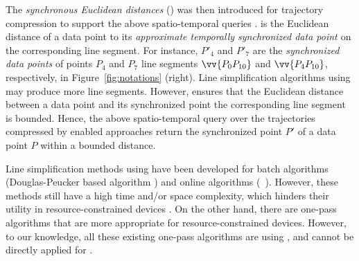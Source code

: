 

The \emph{synchronous Euclidean distances} (\sed) was then introduced for trajectory compression to support the above spatio-temporal queries \cite{Meratnia:Spatiotemporal}. \sed is the Euclidean distance of a data point to its \emph{approximate temporally synchronized data point \cite{Meratnia:Spatiotemporal}} on the corresponding line segment. For instance, $P'_4$ and $P'_7$ are the \emph{synchronized data points} of points $P_4$ and $P_7$ \wrt line segments $\vv{P_0P_{10}}$ and $\vv{P_4P_{10}}$, respectively, in Figure~\ref{fig:notations} (right).
Line simplification algorithms using \sed may produce more line segments. However, \sed ensures that the Euclidean distance between a data point and its  synchronized point \wrt the corresponding line segment is bounded. Hence, the above spatio-temporal query over the trajectories compressed by \sed enabled approaches return the synchronized point $P'$ of a data point $P$ within a bounded distance.

Line simplification methods using \sed have been developed for batch algorithms (\eg Douglas-Peucker based algorithm \dpsed \cite{Meratnia:Spatiotemporal}) and online algorithms (\eg\ \squishe \cite{Muckell:Compression}).
However, these methods still have a high time and/or space complexity, which hinders their utility in resource-constrained devices \cite{Lin:Operb}.
On the other hand, there are one-pass algorithms \cite{Williams:Longest, Sklansky:Cone, Dunham:Cone, Zhao:Sleeve, Lin:Operb}  that are more appropriate for resource-constrained devices.  However, to our knowledge, all these existing one-pass algorithms are using \ped, and cannot be directly applied for \sed.



